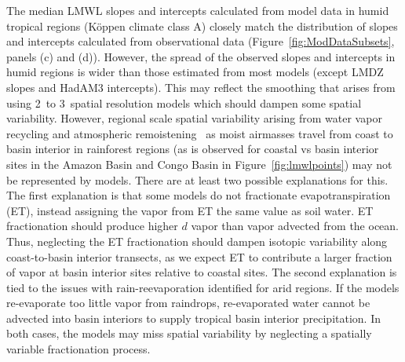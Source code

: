 \documentclass[draft, linenumbers]{agujournal2018}
\begin{document}
The median LMWL slopes and intercepts calculated from model data in humid tropical regions (K{\"o}ppen climate class A) closely match the distribution of slopes and intercepts calculated from observational data (Figure~\ref{fig:ModDataSubsets}, panels (c) and (d)). However, the spread of the observed slopes and intercepts in humid regions is wider than those estimated from most models (except LMDZ slopes and HadAM3 intercepts). This may reflect the smoothing that arises from using 2\textdegree\ to 3\textdegree\ spatial resolution models which should dampen some spatial variability. However, regional scale spatial variability arising from water vapor recycling and atmospheric remoistening~\citep{Worden2007, Noone2012} as moist airmasses travel from coast to basin interior in rainforest regions (as is observed for coastal vs basin interior sites in the Amazon Basin and Congo Basin in Figure~\ref{fig:lmwlpoints}) may not be represented by models. There are at least two possible explanations for this. The first explanation is that some models do not fractionate evapotranspiration (ET), instead assigning the vapor from ET the same value as soil water. ET fractionation should produce higher $d$ vapor than vapor advected from the ocean. Thus, neglecting the ET fractionation should dampen isotopic variability along coast-to-basin interior transects, as we expect ET to contribute a larger fraction of vapor at basin interior sites relative to coastal sites. The second explanation is tied to the issues with rain-reevaporation identified for arid regions. If the models re-evaporate too little vapor from raindrops, re-evaporated water cannot be advected into basin interiors to supply tropical basin interior precipitation. In both cases, the models may miss spatial variability by neglecting a spatially variable fractionation process.
\end{document}
